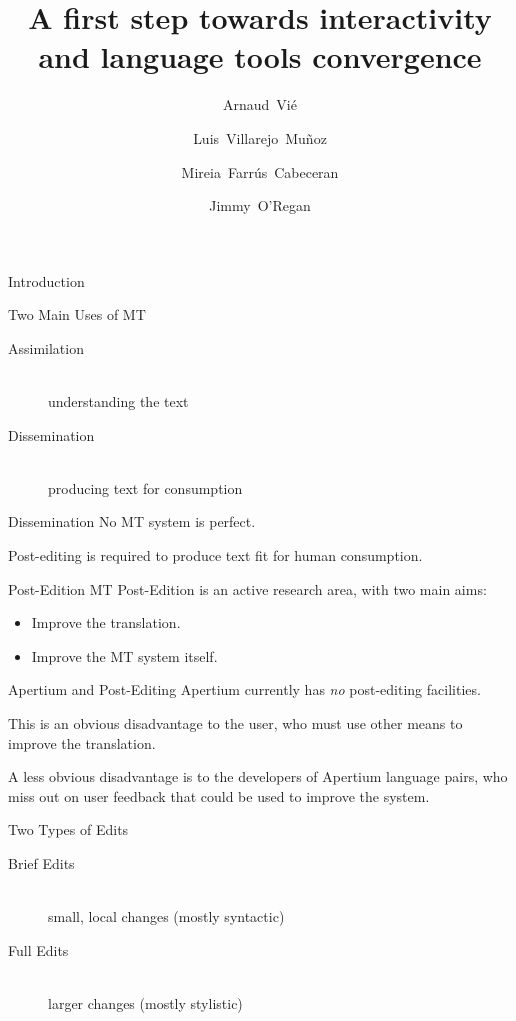 \documentclass{beamer}
\title[Apertium Advanced Web Interface]{A first step towards interactivity and language tools convergence}
\author[Vié, Villarejo Muñoz, Farrús Cabeceran, O'Regan] %
{Arnaud~Vié\inst{1} \and Luis~Villarejo~Muñoz\inst{2} \and Mireia~Farrús~Cabeceran\inst{2} \and Jimmy~O'Regan\inst{3}}
\institute
{
  \inst{1}%
  Informations Systems Engineering \\
  Grenoble INP - Ensimag \\
  {\tt arnaud.vie@ensimag.fr}
  \and
  \inst{2}%
  Learning Technologies Office \\
  Universitat Oberta de Catalunya \\
  {\tt lvillarejo@uoc.edu}, \\* 
  {\tt mfarrusc@uoc.edu}
  \and
  \inst{3}%
  Eolaistriu Technologies \\
  {\tt joregan@gmail.com}
}
\date{}
\begin{document}
\begin{frame}
\titlepage
\end{frame}

\begin{section}{Introduction}
\begin{frame}{Two Main Uses of MT}
\begin{description}
  \item[Assimilation] \hfill \\
  understanding the text
  \item[Dissemination] \hfill \\
  producing text for consumption
\end{description}
\end{frame}

\begin{frame}{Dissemination}
No MT system is perfect.

Post-editing is required to produce text fit for human consumption.
\end{frame}

\begin{frame}{Post-Edition}
MT Post-Edition is an active research area, with two main aims:

\begin{itemize}
\item Improve the translation.
\item Improve the MT system itself.
\end{itemize}
\end{frame}

\begin{frame}{Apertium and Post-Editing}
Apertium currently has {\it no} post-editing facilities.

This is an obvious disadvantage to the user, who must use other means
to improve the translation.

A less obvious disadvantage is to the developers of Apertium language
pairs, who miss out on user feedback that could be used to improve the
system.
\end{frame}

\begin{frame}{Two Types of Edits}
\begin{description}
  \item[Brief Edits] \hfill \\
  small, local changes (mostly syntactic)
  \item[Full Edits] \hfill \\
  larger changes (mostly stylistic)
\end{description}
\end{frame}


\end{section}
\end{document}
